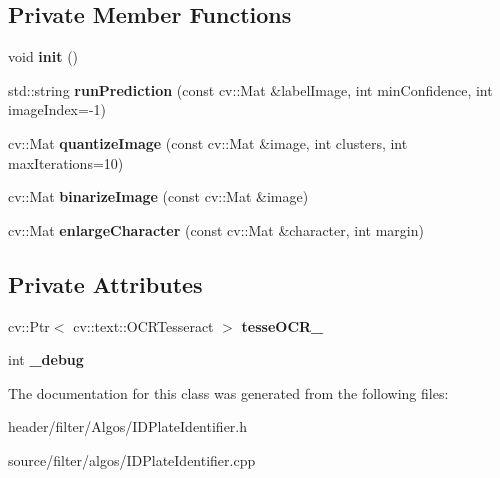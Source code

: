 \subsection*{Private Member Functions}
\begin{DoxyCompactItemize}
\item 
\mbox{\label{classfilter_1_1_algos_1_1_label_o_c_r_abe098d3d0ba6748c747ffe45ebb73fc3}} 
void {\bfseries init} ()
\item 
\mbox{\label{classfilter_1_1_algos_1_1_label_o_c_r_a1d5b7c1183502f53ceaea1359b83c71d}} 
std\+::string {\bfseries run\+Prediction} (const cv\+::\+Mat \&label\+Image, int min\+Confidence, int image\+Index=-\/1)
\item 
\mbox{\label{classfilter_1_1_algos_1_1_label_o_c_r_a52cd13b3ac6ec21dbc78d0e0a6fd4040}} 
cv\+::\+Mat {\bfseries quantize\+Image} (const cv\+::\+Mat \&image, int clusters, int max\+Iterations=10)
\item 
\mbox{\label{classfilter_1_1_algos_1_1_label_o_c_r_adc676a8b15f27142ca1be42056819a1c}} 
cv\+::\+Mat {\bfseries binarize\+Image} (const cv\+::\+Mat \&image)
\item 
\mbox{\label{classfilter_1_1_algos_1_1_label_o_c_r_a4958ea94cef3de0a320f84b0df9c6af2}} 
cv\+::\+Mat {\bfseries enlarge\+Character} (const cv\+::\+Mat \&character, int margin)
\end{DoxyCompactItemize}
\subsection*{Private Attributes}
\begin{DoxyCompactItemize}
\item 
\mbox{\label{classfilter_1_1_algos_1_1_label_o_c_r_ac972634c066436d98a458dc7659c9670}} 
cv\+::\+Ptr$<$ cv\+::text\+::\+O\+C\+R\+Tesseract $>$ {\bfseries tesse\+O\+C\+R\+\_\+}
\item 
\mbox{\label{classfilter_1_1_algos_1_1_label_o_c_r_a158911748b5606318ffa33a8b2dfa881}} 
int {\bfseries \+\_\+debug}
\end{DoxyCompactItemize}


The documentation for this class was generated from the following files\+:\begin{DoxyCompactItemize}
\item 
header/filter/\+Algos/I\+D\+Plate\+Identifier.\+h\item 
source/filter/algos/I\+D\+Plate\+Identifier.\+cpp\end{DoxyCompactItemize}
